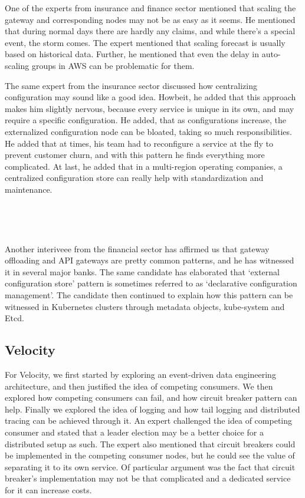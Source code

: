 \documentclass{bmcart}
\begin{document}
One of the experts from insurance and finance sector mentioned that scaling the gateway and corresponding nodes may not be as easy as it seems. He mentioned that during normal days there are hardly any claims, and while there's a special event, the storm comes. The expert mentioned that scaling forecast is usually based on historical data. Further, he mentioned that even the delay in auto-scaling groups in AWS can be problematic for them. 


The same expert from the insurance sector discussed how centralizing configuration may sound like a good idea. Howbeit, he added that this approach makes him slightly nervous, because every service is unique in its own, and may require a specific configuration. He added, that as configurations increase, the externalized configuration node can be bloated, taking so much responsibilities. He added that at times, his team had to reconfigure a service at the fly to prevent customer churn, and with this pattern he finds everything more complicated. At last, he added that in a multi-region operating companies, a centralized configuration store can really help with standardization and maintenance. 

\,

\setlength{\fboxsep}{0.7em}
\noindent{}

\,

Another interiveee from the financial sector has affirmed us that gateway offloading and API gateways are pretty common patterns, and he has witnessed it in several major banks. The same candidate has elaborated that `external configuration store' pattern is sometimes referred to as `declarative configuration management'. The candidate then continued to explain how this pattern can be witnessed in Kubernetes clusters through metadata objects, kube-system and Etcd.


\subsection{Velocity}

For Velocity, we first started by exploring an event-driven data engineering architecture, and then justified the idea of competing consumers. We then explored how competing consumers can fail, and how circuit breaker pattern can help. Finally we explored the idea of logging and how tail logging and distributed tracing can be achieved through it. An expert challenged the idea of competing consumer and stated that a leader election may be a better choice for a distributed setup as such. The expert also mentioned that circuit breakers could be implemented in the competing consumer nodes, but he could see the value of separating it to its own service. Of particular argument was the fact that circuit breaker's implementation may not be that complicated and a dedicated service for it can increase costs.  
\end{document}
